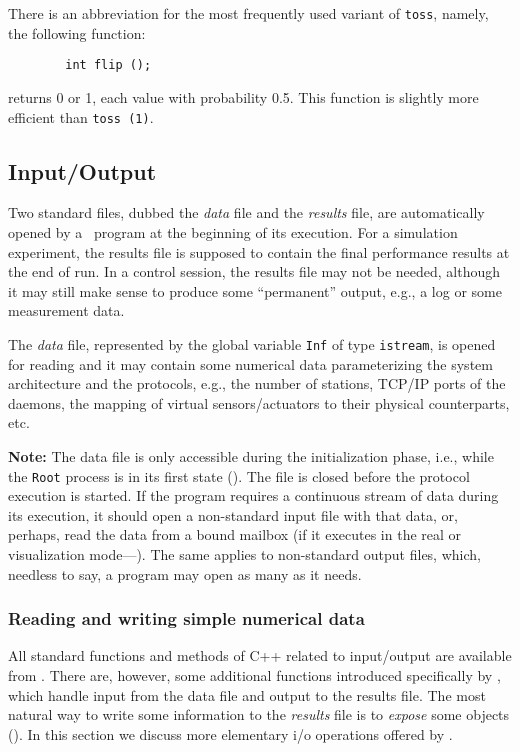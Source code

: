 There is an abbreviation for the most frequently used variant of {\tt toss},
namely, the following function:
\begin{verbatim}
        int flip ();
\end{verbatim}
returns 0 or 1, each value with probability 0.5.
This function is slightly more efficient than {\tt toss~(1)}.

\subsection{Input/Output}
\label{rm_au_io}

Two standard files, dubbed the {\em data\/} file and the {\em results\/}
file, are automatically opened by a \smurph\ program at the beginning of
its execution.
For a simulation experiment, the results file is supposed to contain the
final performance results at the end of run.
In a control session, the results file may not be needed, although it
may still make sense to produce some ``permanent'' output, e.g., a log or
some measurement data.

The {\em data\/} file, represented by the global variable {\tt Inf}
of type {\tt istream}, is opened for reading and it may contain some
numerical data parameterizing the system architecture and the protocols, e.g.,
the number of stations, TCP/IP ports of the daemons, the mapping of virtual
sensors/actuators to their physical counterparts, etc.

\medskip

\noindent
{\bf Note:}
The data file is only accessible during the initialization phase,
i.e., while the {\tt Root} process is in its first state ().
The file is closed before the protocol execution is started.
If the program requires a continuous stream of data during its execution,
it should open a non-standard input file with that data, or, perhaps, read
the data from a bound mailbox (if it executes in the
real or visualization mode---).
The same applies to non-standard output files, which, needless to say, a
program may open as many as it needs.

\subsubsection{Reading and writing simple numerical data}
\label{rm_au_io_nd}

All standard functions and methods of C++ related to input/output are
available from \smurph.
There are, however, some additional functions introduced specifically 
by \smurph, which handle input from the data file and output to the
results file.
The most natural way to write some information to the {\em results\/} file
is to {\em expose\/} some objects ().
In this section we discuss more elementary i/o
operations offered by \smurph.

